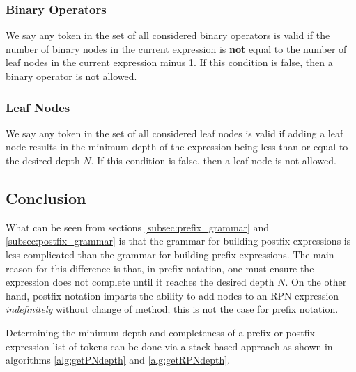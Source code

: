 \documentclass[12pt]{iopart}
\begin{document}
\subsubsection{Binary Operators}
We say any token in the set of all considered binary operators is valid if the number of binary nodes in the current expression is \textbf{not} equal to the number of leaf nodes in the current expression minus 1. If this condition is false, then a binary operator is not allowed.
\subsubsection{Leaf Nodes}
We say any token in the set of all considered leaf nodes is valid if adding a leaf node results in the minimum depth of the expression being less than or equal to the desired depth $N$. If this condition is false, then a leaf node is not allowed.

\subsection{Conclusion}
What can be seen from sections \ref{subsec:prefix_grammar} and \ref{subsec:postfix_grammar} is that the grammar for building postfix expressions is less complicated than the grammar for building prefix expressions. The main reason for this difference is that, in prefix notation, one must ensure the expression does not complete until it reaches the desired depth $N$. On the other hand, postfix notation imparts the ability to add nodes to an RPN expression \emph{indefinitely} without change of method; this is not the case for prefix notation. \par Determining the minimum depth and completeness of a prefix or postfix expression list of tokens can be done via a stack-based approach as shown in algorithms \ref{alg:getPNdepth} and \ref{alg:getRPNdepth}.
\end{document}
